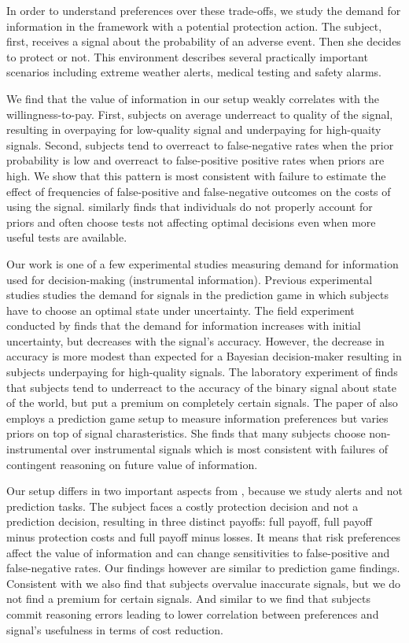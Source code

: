 \documentclass[12pt,a4paper]{article}
\begin{document}
In order to understand preferences over these trade-offs, we study the demand for information in the framework with a potential protection action. The subject, first, receives a signal about the probability of an adverse event. Then she decides to protect or not. This environment describes several practically important scenarios including extreme weather alerts, medical testing and safety alarms. 

We find that the value of information in our setup weakly correlates with the willingness-to-pay. First, subjects on average underreact to quality of the signal, resulting in overpaying for low-quality signal and underpaying for high-quaity signals. Second, subjects tend to overreact to false-negative rates when the prior probability is low and overreact to false-positive positive rates when priors are high. We show that this pattern is most consistent with failure to estimate the effect of frequencies of false-positive and false-negative outcomes on the costs of using the signal. \citep{xu_revealed_2020} similarly finds that individuals do not properly account for priors and often choose tests not affecting optimal decisions even when more useful tests are available.

Our work is one of a few experimental studies measuring demand for information used for decision-making (instrumental information). Previous experimental studies studies the demand for signals in the prediction game in which subjects have to choose an optimal state under uncertainty. The field experiment conducted by \citep{hoffman_how_2016} finds that the demand for information increases with initial uncertainty, but decreases with the signal's accuracy. However, the decrease in accuracy is more modest than expected for a Bayesian decision-maker resulting in subjects underpaying for high-quality signals. The laboratory experiment of \citet{ambuehl_belief_2018} finds that subjects tend to underreact to the accuracy of the binary signal about state of the world, but put a premium on completely certain signals. The paper of \citet{xu_revealed_2020} also employs a prediction game setup to measure information preferences but varies priors on top of signal charasteristics. She finds that many subjects choose non-instrumental over instrumental signals which is most consistent with failures of contingent reasoning on future value of information.

Our setup differs in two important aspects from \citep*{ambuehl_belief_2018, xu_revealed_2020}, because we study alerts and not prediction tasks. The subject faces a costly protection decision and not a prediction decision, resulting in three distinct payoffs: full payoff, full payoff minus protection costs and full payoff minus losses. It means that risk preferences affect the value of information and can change sensitivities to false-positive and false-negative rates. Our findings however are similar to prediction game findings. Consistent with \citet{ambuehl_belief_2018} we also find that subjects overvalue inaccurate signals, but we do not find a premium for certain signals.  And similar to \citet{xu_revealed_2020} we find that subjects commit reasoning errors leading to lower correlation between preferences and signal's usefulness in terms of cost reduction.
\end{document}
